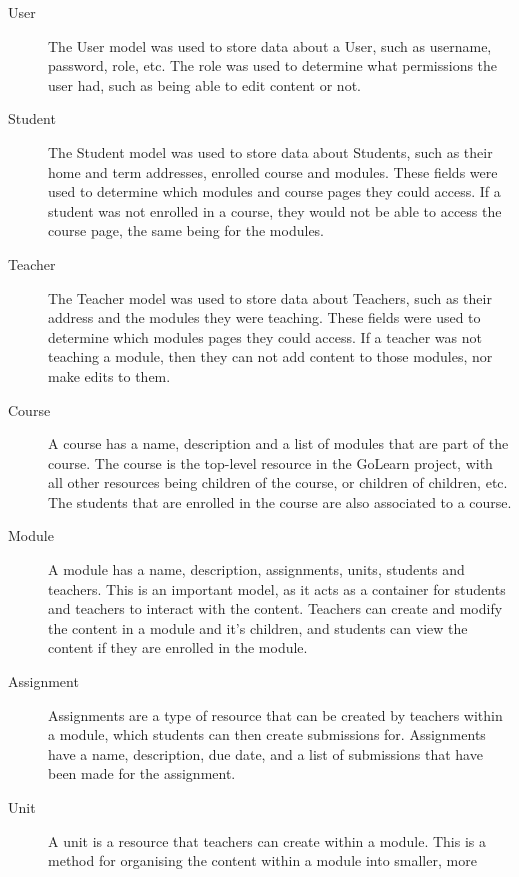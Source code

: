 \documentclass[11pt, a4paper,twoside]{report}
\theoremstyle{plain} %
\theoremstyle{definition} %
\numberwithin{equation}{chapter}
\begin{document}
\begin{description}

    \item[User] {
        The User model was used to store data about a User, such as username,
        password, role, etc. The role was used to determine what permissions
        the user had, such as being able to edit content or not.
        }
    \item[Student] {
        The Student model was used to store data about Students, such as their
        home and term addresses, enrolled course and modules. These fields were
        used to determine which modules and course pages they could access. If
        a student was not enrolled in a course, they would not be able to
        access the course page, the same being for the modules.
        }
    \item[Teacher] {
        The Teacher model was used to store data about Teachers, such as their
        address and the modules they were teaching. These fields were used to
        determine which modules pages they could access. If a teacher was not
        teaching a module, then they can not add content to those modules, nor
        make edits to them.
        }
    \item[Course] {
        A course has a name, description and a list of modules that are part of
        the course. The course is the top-level resource in the GoLearn
        project, with all other resources being children of the course, or
        children of children, etc. The students that are enrolled in the course
        are also associated to a course.
        }
    \item[Module] {
        A module has a name, description, assignments, units, students and
        teachers. This is an important model, as it acts as a container for
        students and teachers to interact with the content. Teachers can create
        and modify the content in a module and it's children, and students can
        view the content if they are enrolled in the module.
        }
    \item[Assignment] {
        Assignments are a type of resource that can be created by teachers
        within a module, which students can then create submissions for.
        Assignments have a name, description, due date, and a list of
        submissions that have been made for the assignment.
        }
    \item[Unit] {
        A unit is a resource that teachers can create within a module. This is
        a method for organising the content within a module into smaller, more
}
\end{description}
\end{document}
